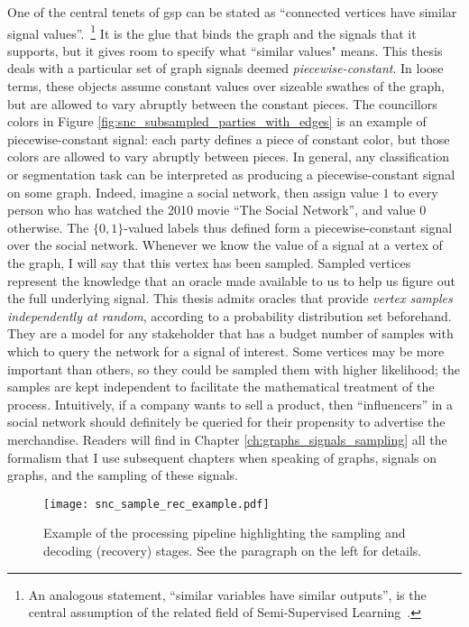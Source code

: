One of the central tenets of \acrshort{gsp} can be stated as ``connected vertices have similar signal values''.~\footnote{An analogous statement, ``similar variables have similar outputs'', is the central assumption of the related field of Semi-Supervised Learning~\cite{chapelle2006}.} It is the glue that binds the graph and the signals that it supports, but it gives room to specify what ``similar values" means. This thesis deals with a particular set of graph signals deemed \emph{piecewise-constant}. In loose terms, these objects assume constant values over sizeable swathes of the graph, but are allowed to vary abruptly between the constant pieces. The councillors colors in Figure \ref{fig:snc_subsampled_parties_with_edges} is an example of piecewise-constant signal: each party defines a piece of constant color, but those colors are allowed to vary abruptly between pieces. In general, any classification or segmentation task can be interpreted as producing a piecewise-constant signal on some graph. Indeed, imagine a social network, then assign value $1$ to every person who has watched the 2010 movie ``The Social Network'', and value $0$ otherwise. The $\{0,1\}$-valued labels thus defined form a piecewise-constant signal over the social network. Whenever we know the value of a signal at a vertex of the graph, I will say that this vertex has been sampled. Sampled vertices represent the knowledge that an oracle made available to us to help us figure out the full underlying signal. This thesis admits oracles that provide \emph{vertex samples independently at random}, according to a probability distribution set beforehand. They are a model for any stakeholder that has a budget number of samples with which to query the network for a signal of interest. Some vertices may be more important than others, so they could be sampled them with higher likelihood; the samples are kept independent to facilitate the mathematical treatment of the process. Intuitively, if a company wants to sell a product, then ``influencers'' in a social network should definitely be queried for their propensity to advertise the merchandise. Readers will find in Chapter \ref{ch:graphs_signals_sampling} all the formalism that I use subsequent chapters when speaking of graphs, signals on graphs, and the sampling of these signals.

\begin{wrapfigure}{o}{0.35\textwidth}
    \centering
    \texttt{[image: snc\_sample\_rec\_example.pdf]}
    \caption[The processing pipeline highlighting the sampling and decoding stages]{Example of the processing pipeline highlighting the sampling and decoding (recovery) stages. See the paragraph on the left for details.}
    \label{fig:snc_sample_rec_example}
\end{wrapfigure}

